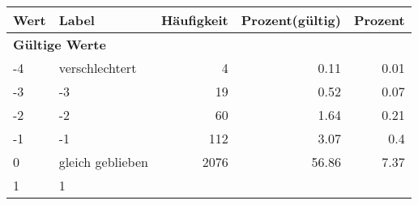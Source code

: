      \begin{longtable}{lXrrr}
     \toprule
     \textbf{Wert} & \textbf{Label} & \textbf{Häufigkeit} & \textbf{Prozent(gültig)} & \textbf{Prozent} \\
     \endhead
     \midrule
     \multicolumn{5}{l}{\textbf{Gültige Werte}}\\

     -4 &
     \multicolumn{1}{X}{ verschlechtert   } &


       \num{4} &
       \num[round-mode=places,round-precision=2]{0.11} &
         \num[round-mode=places,round-precision=2]{0.01} \\

     -3 &
     \multicolumn{1}{X}{ -3   } &


       \num{19} &
       \num[round-mode=places,round-precision=2]{0.52} &
         \num[round-mode=places,round-precision=2]{0.07} \\

     -2 &
     \multicolumn{1}{X}{ -2   } &


       \num{60} &
       \num[round-mode=places,round-precision=2]{1.64} &
         \num[round-mode=places,round-precision=2]{0.21} \\

     -1 &
     \multicolumn{1}{X}{ -1   } &


       \num{112} &
       \num[round-mode=places,round-precision=2]{3.07} &
         \num[round-mode=places,round-precision=2]{0.4} \\

     0 &
     \multicolumn{1}{X}{ gleich geblieben   } &


       \num{2076} &
       \num[round-mode=places,round-precision=2]{56.86} &
         \num[round-mode=places,round-precision=2]{7.37} \\

     1 &
     \multicolumn{1}{X}{ 1   } &



\end{longtable}
